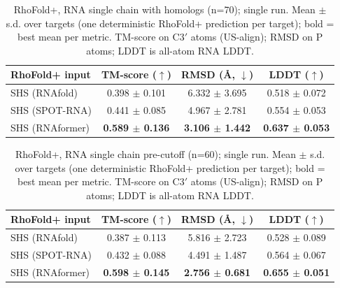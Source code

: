 \begin{table}[htbp]
\centering
\caption{RhoFold+, RNA single chain with homologs (n=70); single run. Mean $\pm$ s.d. over targets (one deterministic RhoFold+ prediction per target); bold = best mean per metric. TM-score on C3$'$ atoms (US-align); RMSD on P atoms; LDDT is all-atom RNA LDDT.}
\label{tab:rf_rna_single_chain_with_homologs}
\begin{tabular}{lccc}
\toprule
RhoFold+ input & TM-score ($\uparrow$) & RMSD (\AA, $\downarrow$) & LDDT ($\uparrow$) \\
\midrule
SHS (RNAfold) & 0.398 $\pm$ 0.101 & 6.332 $\pm$ 3.695 & 0.518 $\pm$ 0.072 \\
SHS (SPOT-RNA) & 0.441 $\pm$ 0.085 & 4.967 $\pm$ 2.781 & 0.554 $\pm$ 0.053 \\
SHS (RNAformer) & \textbf{0.589 $\pm$ 0.136} & \textbf{3.106 $\pm$ 1.442} & \textbf{0.637 $\pm$ 0.053} \\
\bottomrule
\end{tabular}
\end{table}

\begin{table}[htbp]
\centering
\caption{RhoFold+, RNA single chain pre-cutoff (n=60); single run. Mean $\pm$ s.d. over targets (one deterministic RhoFold+ prediction per target); bold = best mean per metric. TM-score on C3$'$ atoms (US-align); RMSD on P atoms; LDDT is all-atom RNA LDDT.}
\label{tab:rf_rna_single_chain_pre_cutoff}
\begin{tabular}{lccc}
\toprule
RhoFold+ input & TM-score ($\uparrow$) & RMSD (\AA, $\downarrow$) & LDDT ($\uparrow$) \\
\midrule
SHS (RNAfold) & 0.387 $\pm$ 0.113 & 5.816 $\pm$ 2.723 & 0.528 $\pm$ 0.089 \\
SHS (SPOT-RNA) & 0.432 $\pm$ 0.088 & 4.491 $\pm$ 1.487 & 0.564 $\pm$ 0.067 \\
SHS (RNAformer) & \textbf{0.598 $\pm$ 0.145} & \textbf{2.756 $\pm$ 0.681} & \textbf{0.655 $\pm$ 0.051} \\
\bottomrule
\end{tabular}
\end{table}

